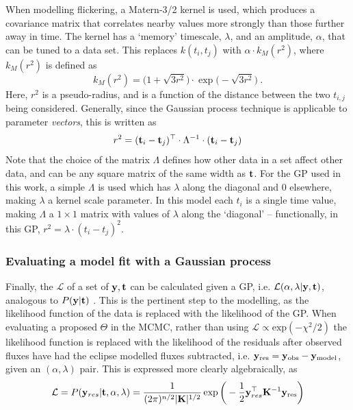 When modelling flickering, a Matern-3/2 kernel is used, which produces a covariance matrix that correlates nearby values more strongly than those further away in time. The kernel has a `memory' timescale, $\lambda$, and an amplitude, $\alpha$, that can be tuned to a data set. This replaces $k(t_i, t_j)$ with $\alpha \cdot k_{M}(r^2)$, where $k_{M}(r^2)$ is defined as
\begin{equation}
    k_{M}(r^2) = \big(1+\sqrt{3r^2}\big) \cdot\exp\big(-\sqrt{3r^2}\big)\ .
\end{equation}
Here, $r^2$ is a pseudo-radius, and is a function of the distance between the two $t_{i,j}$ being considered. Generally, since the Gaussian process technique is applicable to parameter \textit{vectors}, this is written as
\begin{equation}
    r^2 = ({\bf t}_i - {\bf t}_j)^{\top} \cdot \Lambda^{-1} \cdot ({\bf t}_i - {\bf t}_j)
\end{equation}
Note that the choice of the matrix $\Lambda$ defines how other data in a set affect other data, and can be any square matrix of the same width as $\bf t$. For the GP used in this work, a simple $\Lambda$ is used which has $\lambda$ along the diagonal and 0 elsewhere, making $\lambda$ a kernel scale parameter.
In this model each $t_i$ is a single time value, making $\Lambda$ a $1\times 1$ matrix with values of $\lambda$ along the `diagonal' -- functionally, in this GP, $r^2 = \lambda \cdot (t_i - t_j)^2$.

\subsubsection{Evaluating a model fit with a Gaussian process}
\label{sect:modelling:GP model evaluation}

Finally, the $\mathcal{L}$ of a set of ${\bf y}, {\bf t}$ can be calculated given a GP, i.e. $\mathcal{L}(\alpha, \lambda | {\bf y}, {\bf t})$, analogous to $P({\bf y} | {\bf t})$ \citep{rasmussen2006}.
This is the pertinent step to the modelling, as the likelihood function of the data is replaced with the likelihood of the GP.
When evaluating a proposed $\Theta$ in the MCMC, rather than using $\mathcal{L} \propto \mathrm{exp}(-\chi^2/2)$ the likelihood function is replaced with the likelihood of the residuals after observed fluxes have had the eclipse modelled fluxes subtracted, i.e. ${\bf y}_{\rm res} = {\bf y}_{\rm obs} - {\bf y}_{\rm model}$, given an $(\alpha, \lambda)$ pair. This is expressed more clearly algebraically, as
\begin{equation}
    \mathcal{L} = P({\bf y}_{res} | {\bf t}, \alpha, \lambda) = \frac{1}{(2\pi)^{n/2} |{\bf K}|^{1/2}} \exp \bigg(- \frac{1}{2} {\bf y}_{res}^{\top} {\bf K}^{-1} {\bf y}_{\rm res} \bigg)
\end{equation}


